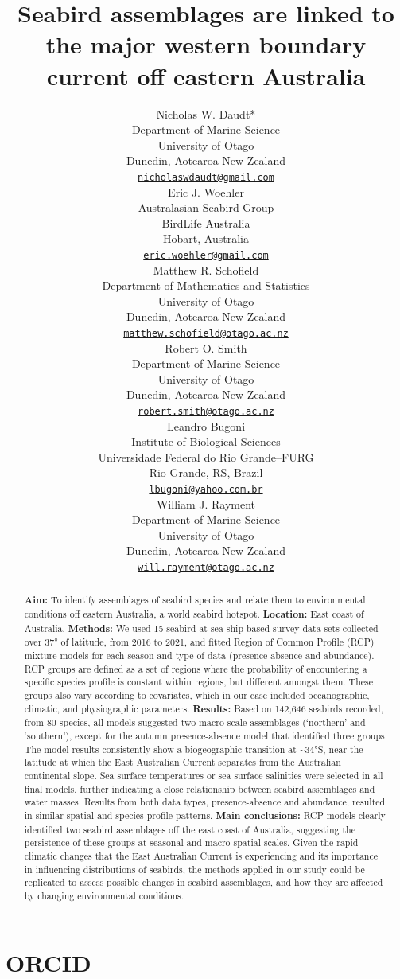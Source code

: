 \documentclass{article}
\title{Seabird assemblages are linked to the major western boundary current off eastern Australia}
\author{
    Nicholas W. Daudt*
   \\
    Department of Marine Science \\
    University of Otago \\
  Dunedin, Aotearoa New Zealand \\
  \texttt{\href{mailto:nicholaswdaudt@gmail.com}{\nolinkurl{nicholaswdaudt@gmail.com}}} \\
   \And
    Eric J. Woehler
   \\
    Australasian Seabird Group \\
    BirdLife Australia \\
  Hobart, Australia \\
  \texttt{\href{mailto:eric.woehler@gmail.com}{\nolinkurl{eric.woehler@gmail.com}}} \\
   \And
    Matthew R. Schofield
   \\
    Department of Mathematics and Statistics \\
    University of Otago \\
  Dunedin, Aotearoa New Zealand \\
  \texttt{\href{mailto:matthew.schofield@otago.ac.nz}{\nolinkurl{matthew.schofield@otago.ac.nz}}} \\
   \And
    Robert O. Smith
   \\
    Department of Marine Science \\
    University of Otago \\
  Dunedin, Aotearoa New Zealand \\
  \texttt{\href{mailto:robert.smith@otago.ac.nz}{\nolinkurl{robert.smith@otago.ac.nz}}} \\
   \And
    Leandro Bugoni
   \\
    Institute of Biological Sciences \\
    Universidade Federal do Rio Grande--FURG \\
  Rio Grande, RS, Brazil \\
  \texttt{\href{mailto:lbugoni@yahoo.com.br}{\nolinkurl{lbugoni@yahoo.com.br}}} \\
   \And
    William J. Rayment
   \\
    Department of Marine Science \\
    University of Otago \\
  Dunedin, Aotearoa New Zealand \\
  \texttt{\href{mailto:will.rayment@otago.ac.nz}{\nolinkurl{will.rayment@otago.ac.nz}}} \\
  }
\begin{document}
\maketitle


\begin{abstract}
\textbf{Aim:} To identify assemblages of seabird species and relate them to environmental conditions off eastern Australia, a world seabird hotspot.
\textbf{Location:} East coast of Australia.
\textbf{Methods:} We used 15 seabird at-sea ship-based survey data sets collected over 37° of latitude, from 2016 to 2021, and fitted Region of Common Profile (RCP) mixture models for each season and type of data (presence-absence and abundance). RCP groups are defined as a set of regions where the probability of encountering a specific species profile is constant within regions, but different amongst them. These groups also vary according to covariates, which in our case included oceanographic, climatic, and physiographic parameters.
\textbf{Results:} Based on 142,646 seabirds recorded, from 80 species, all models suggested two macro-scale assemblages (`northern' and `southern'), except for the autumn presence-absence model that identified three groups. The model results consistently show a biogeographic transition at \textasciitilde34°S, near the latitude at which the East Australian Current separates from the Australian continental slope. Sea surface temperatures or sea surface salinities were selected in all final models, further indicating a close relationship between seabird assemblages and water masses. Results from both data types, presence-absence and abundance, resulted in similar spatial and species profile patterns.
\textbf{Main conclusions:} RCP models clearly identified two seabird assemblages off the east coast of Australia, suggesting the persistence of these groups at seasonal and macro spatial scales. Given the rapid climatic changes that the East Australian Current is experiencing and its importance in influencing distributions of seabirds, the methods applied in our study could be replicated to assess possible changes in seabird assemblages, and how they are affected by changing environmental conditions.
\end{abstract}


\hypertarget{orcid}{%
\section*{ORCID}\label{orcid}}
\end{document}

